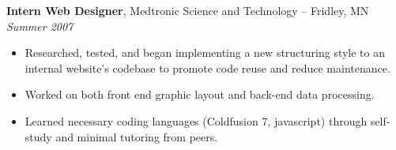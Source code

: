 {\bf Intern Web Designer}, Medtronic Science and Technology -- Fridley, MN\\
{\it Summer 2007}
\begin{itemize}
	\item Researched, tested, and began implementing a new structuring style to an internal website’s codebase to promote code reuse and reduce maintenance.
	\item Worked on both front end graphic layout and back-end data processing.
	\item Learned necessary coding languages (Coldfusion 7, javascript) through self-study and minimal tutoring from peers.
\end{itemize}